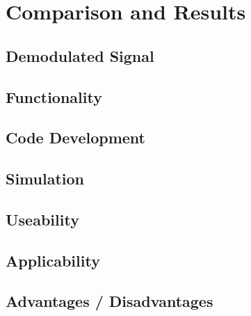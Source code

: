 \chapter{Comparison and Results}
\label{cha:ComparisonAndResults}
\section{Demodulated Signal}

\section{Functionality}

\section{Code Development}

\section{Simulation}

\section{Useability}

\section{Applicability}

\section{Advantages / Disadvantages}


